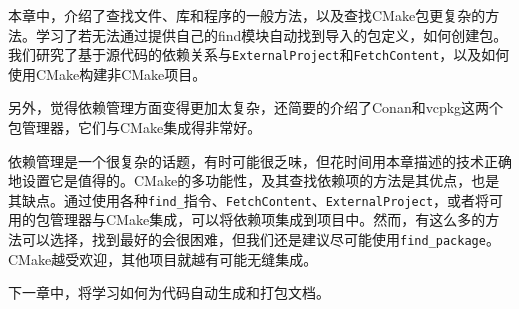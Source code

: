 本章中，介绍了查找文件、库和程序的一般方法，以及查找CMake包更复杂的方法。学习了若无法通过提供自己的find模块自动找到导入的包定义，如何创建包。我们研究了基于源代码的依赖关系与\texttt{ExternalProject}和\texttt{FetchContent}，以及如何使用CMake构建非CMake项目。

另外，觉得依赖管理方面变得更加太复杂，还简要的介绍了Conan和vcpkg这两个包管理器，它们与CMake集成得非常好。

依赖管理是一个很复杂的话题，有时可能很乏味，但花时间用本章描述的技术正确地设置它是值得的。CMake的多功能性，及其查找依赖项的方法是其优点，也是其缺点。通过使用各种\texttt{find\_}指令、\texttt{FetchContent}、\texttt{ExternalProject}，或者将可用的包管理器与CMake集成，可以将依赖项集成到项目中。然而，有这么多的方法可以选择，找到最好的会很困难，但我们还是建议尽可能使用\texttt{find\_package}。CMake越受欢迎，其他项目就越有可能无缝集成。

下一章中，将学习如何为代码自动生成和打包文档。